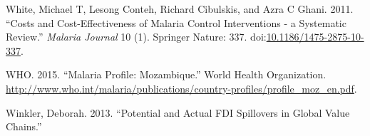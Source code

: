 \documentclass[]{article}
\begin{document}
\hypertarget{ref-White_2011}{}
White, Michael T, Lesong Conteh, Richard Cibulskis, and Azra C Ghani.
2011. ``Costs and Cost-Effectiveness of Malaria Control Interventions -
a Systematic Review.'' \emph{Malaria Journal} 10 (1). Springer Nature:
337.
doi:\href{https://doi.org/10.1186/1475-2875-10-337}{10.1186/1475-2875-10-337}.

\hypertarget{ref-whoprof}{}
WHO. 2015. ``Malaria Profile: Mozambique.'' World Health Organization.
\url{http://www.who.int/malaria/publications/country-profiles/profile_moz_en.pdf}.

\hypertarget{ref-Winkler}{}
Winkler, Deborah. 2013. ``Potential and Actual FDI Spillovers in Global
Value Chains.''
\end{document}
